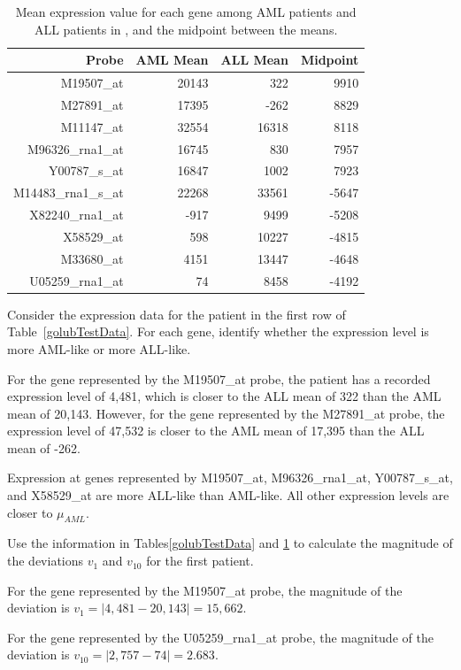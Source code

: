 \begin{table}[ht]
	\centering
	\footnotesize
	\begin{tabular}{r|r|r|r}
		\hline
		Probe & AML Mean & ALL Mean & Midpoint \\ 
		\hline
		M19507\_at & 20143 & 322 & 9910 \\ 
		M27891\_at & 17395 & -262 & 8829 \\ 
		M11147\_at & 32554 & 16318 & 8118 \\ 
		M96326\_rna1\_at & 16745 & 830 & 7957 \\ 
		Y00787\_s\_at & 16847 & 1002 & 7923 \\ 
		M14483\_rna1\_s\_at & 22268 & 33561 & -5647 \\ 
		X82240\_rna1\_at & -917 & 9499 & -5208 \\ 
		X58529\_at & 598 & 10227 & -4815 \\ 
		M33680\_at & 4151 & 13447 & -4648 \\ 
		U05259\_rna1\_at & 74 & 8458 & -4192 \\ 
		\hline
	\end{tabular}
		\caption{Mean expression value for each gene among AML patients and ALL patients in , and the midpoint between the means. \label{golubTrainMeansMidpoints}}
\end{table}


\begin{example}{Consider the expression data for the patient in the first row of Table~\ref{golubTestData}. For each gene, identify whether the expression level is more AML-like or more ALL-like.}
	
For the gene represented by the M19507\_at probe, the patient has a recorded expression level of 4,481, which is closer to the ALL mean of 322 than the AML mean of 20,143. However, for the gene represented by the M27891\_at probe, the expression level of 47,532 is closer to the AML mean of 17,395 than the ALL mean of -262. 

Expression at genes represented by M19507\_at, M96326\_rna1\_at, Y00787\_s\_at, and X58529\_at are more ALL-like than AML-like. All other expression levels are closer to $\mu_{AML}$.
	
\end{example}

\begin{example}{Use the information in Tables\ref{golubTestData} and \ref{golubTrainMeansMidpoints} to calculate the magnitude of the deviations $v_1$ and $v_{10}$ for the first patient.}
	
For the gene represented by the M19507\_at probe, the magnitude of the deviation is $v_1 = |4,481 - 20,143| = 15,662$.	

For the gene represented by the U05259\_rna1\_at probe, the magnitude of the deviation is $v_{10} = |2,757 - 74| = 2.683$.
	
\end{example}	

